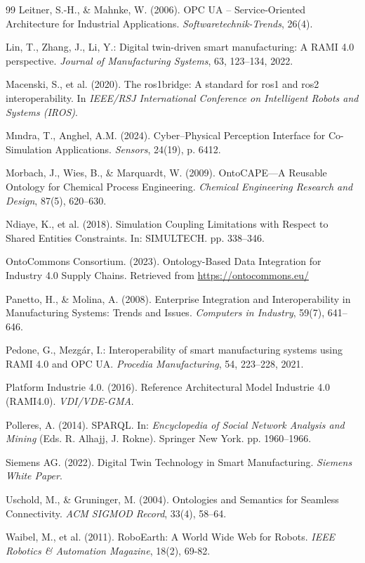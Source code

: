 \documentclass{article} %
\begin{document}
\begin{thebibliography}{99}
Leitner, S.-H., \& Mahnke, W. (2006). OPC UA – Service-Oriented Architecture for Industrial Applications. \emph{Softwaretechnik-Trends}, 26(4).

Lin, T., Zhang, J., Li, Y.: Digital twin-driven smart manufacturing: A RAMI 4.0 perspective. \emph{Journal of Manufacturing Systems}, 63, 123–134, 2022.

Macenski, S., et al. (2020). The ros1bridge: A standard for ros1 and ros2 interoperability. In \emph{IEEE/RSJ International Conference on Intelligent Robots and Systems (IROS)}.

Mındra, T., Anghel, A.M. (2024). Cyber–Physical Perception Interface for Co-Simulation Applications. \emph{Sensors}, 24(19), p. 6412.

Morbach, J., Wies, B., \& Marquardt, W. (2009). OntoCAPE—A Reusable Ontology for Chemical Process Engineering. \emph{Chemical Engineering Research and Design}, 87(5), 620--630.

Ndiaye, K., et al. (2018). Simulation Coupling Limitations with Respect to Shared Entities Constraints. In: SIMULTECH. pp. 338–346.

OntoCommons Consortium. (2023). Ontology-Based Data Integration for Industry 4.0 Supply Chains. Retrieved from \url{https://ontocommons.eu/ }

Panetto, H., \& Molina, A. (2008). Enterprise Integration and Interoperability in Manufacturing Systems: Trends and Issues. \emph{Computers in Industry}, 59(7), 641--646.

Pedone, G., Mezgár, I.: Interoperability of smart manufacturing systems using RAMI 4.0 and OPC UA. \emph{Procedia Manufacturing}, 54, 223–228, 2021.

Platform Industrie 4.0. (2016). Reference Architectural Model Industrie 4.0 (RAMI4.0). \emph{VDI/VDE-GMA}.

Polleres, A. (2014). SPARQL. In: \emph{Encyclopedia of Social Network Analysis and Mining} (Eds. R. Alhajj, J. Rokne). Springer New York. pp. 1960–1966.

Siemens AG. (2022). Digital Twin Technology in Smart Manufacturing. \emph{Siemens White Paper}.

Uschold, M., \& Gruninger, M. (2004). Ontologies and Semantics for Seamless Connectivity. \emph{ACM SIGMOD Record}, 33(4), 58--64.

Waibel, M., et al. (2011). RoboEarth: A World Wide Web for Robots. \emph{IEEE Robotics \& Automation Magazine}, 18(2), 69-82.

\end{thebibliography}
\end{document}
